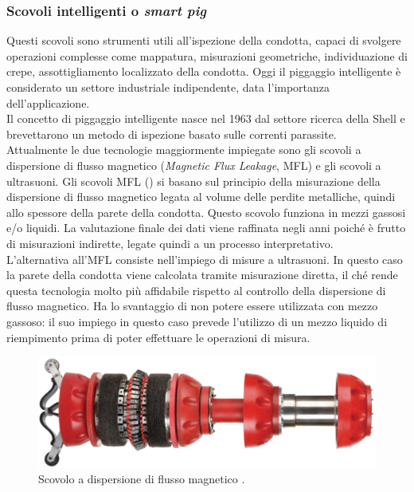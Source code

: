 \subsubsection*{Scovoli intelligenti o \textit{smart pig}}
Questi scovoli sono strumenti utili all'ispezione della condotta, capaci di svolgere operazioni complesse come mappatura, misurazioni geometriche, individuazione di crepe, assottigliamento localizzato della condotta. Oggi il piggaggio intelligente è considerato un settore industriale indipendente, data l'importanza dell'applicazione.\\
Il concetto di piggaggio intelligente nasce nel 1963 dal settore ricerca della Shell e brevettarono un metodo di ispezione basato sulle correnti parassite.\\
Attualmente le due tecnologie maggiormente impiegate sono gli scovoli a dispersione di flusso magnetico (\textit{Magnetic Flux Leakage}, MFL) e gli scovoli a ultrasuoni.
Gli scovoli MFL () si basano sul principio della misurazione della dispersione di flusso magnetico legata al volume delle perdite metalliche, quindi allo spessore della parete della condotta. Questo scovolo funziona in mezzi gassosi e/o liquidi. La valutazione finale dei dati viene raffinata negli anni poiché è frutto di misurazioni indirette, legate quindi a un processo interpretativo.\\
L'alternativa all'MFL consiste nell'impiego di misure a ultrasuoni. In questo caso la parete della condotta viene calcolata tramite misurazione diretta, il ché rende questa tecnologia molto più affidabile rispetto al controllo della dispersione di flusso magnetico. Ha lo svantaggio di non potere essere utilizzata con mezzo gassoso: il suo impiego in questo caso prevede l'utilizzo di un mezzo liquido di riempimento prima di poter effettuare le operazioni di misura.

\begin{figure}[htbp]
	\centering
	\includegraphics[width=.6\textwidth]{fig/pig/smartpig}
	\caption{Scovolo a dispersione di flusso magnetico \parencite{williamson2015guide}.}
	\label{fig:smartpig}
\end{figure}

